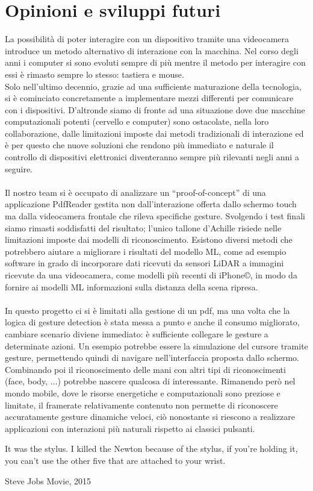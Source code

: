 \section{Opinioni e sviluppi futuri}
La possibilità di poter interagire con un dispositivo tramite una videocamera introduce un metodo alternativo di interazione con la macchina. Nel corso degli anni i computer si sono evoluti sempre di più mentre il metodo per interagire con essi è rimasto sempre lo stesso: tastiera e mouse.\\
Solo nell'ultimo decennio, grazie ad una sufficiente maturazione della tecnologia, si è cominciato concretamente a implementare mezzi differenti per comunicare con i dispositivi. D'altronde siamo di fronte ad una situazione dove due macchine computazionali potenti (cervello e computer) sono ostacolate, nella loro collaborazione, dalle limitazioni imposte dai metodi tradizionali di interazione ed è per questo che nuove soluzioni che rendono più immediato e naturale il controllo di dispositivi elettronici diventeranno sempre più rilevanti negli anni a seguire.\\
\\
\noindent Il nostro team si è occupato di analizzare un “proof-of-concept” di una applicazione PdfReader gestita non dall'interazione offerta dallo schermo touch ma dalla videocamera frontale che rileva specifiche gesture. Svolgendo i test finali siamo rimasti soddisfatti del risultato; l'unico tallone d'Achille risiede nelle limitazioni imposte dai modelli di riconoscimento.
Esistono diversi metodi che potrebbero aiutare a migliorare i risultati del modello ML, come ad esempio software in grado di incorporare dati ricevuti da sensori LiDAR a immagini ricevute da una videocamera, come modelli più recenti di iPhone©, in modo da fornire ai modelli ML informazioni sulla distanza della scena ripresa.\\
\\
\noindent In questo progetto ci si è limitati alla gestione di un pdf, ma una volta che la logica di gesture detection è stata messa a punto e anche il consumo migliorato, cambiare scenario diviene immediato: è sufficiente collegare le gesture a determinate azioni. Un esempio potrebbe essere la simulazione del cursore tramite gesture, permettendo quindi di navigare nell'interfaccia proposta dallo schermo. Combinando poi il riconoscimento delle mani con altri tipi di riconoscimenti (face, body, ...) potrebbe nascere qualcosa di interessante. Rimanendo però nel mondo mobile, dove le risorse energetiche e computazionali sono preziose e limitate, il framerate relativamente contenuto non permette di riconoscere accuratamente gesture dinamiche veloci, ciò nonostante si riescono a realizzare applicazioni con interazioni più naturali rispetto ai classici pulsanti.


\epigraph{It was the stylus. I killed the Newton because of the stylus, if you're holding it, you can't use the other five that are attached to your wrist.}{Steve Jobs Movie, 2015}
